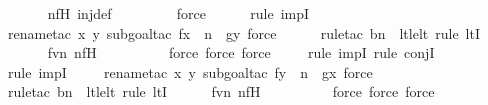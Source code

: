 \begin{isabellebody}
\ \ \ \ \isamarkupfalse%
\ nfH\ inj{\isacharunderscore}{\kern0pt}def\ \isanewline
\ \ \ \ \ \ \isamarkupfalse%
\ force\isanewline
\ \ \ \ \ \isamarkupfalse%
{\isacharparenleft}{\kern0pt}rule\ impI{\isacharparenright}{\kern0pt}{\isacharplus}{\kern0pt}\isanewline
\ \ \ \ \ \isamarkupfalse%
{\isacharparenleft}{\kern0pt}rename{\isacharunderscore}{\kern0pt}tac\ x\ y{\isacharcomma}{\kern0pt}\ subgoal{\isacharunderscore}{\kern0pt}tac\ {\isachardoublequoteopen}f{\isacharbackquote}{\kern0pt}x\ {\isacharless}{\kern0pt}\ n\ {\isacharhash}{\kern0pt}{\isacharplus}{\kern0pt}\ g{\isacharbackquote}{\kern0pt}y{\isachardoublequoteclose}{\isacharcomma}{\kern0pt}\ force{\isacharparenright}{\kern0pt}\isanewline
\ \ \ \ \ \isamarkupfalse%
{\isacharparenleft}{\kern0pt}rule{\isacharunderscore}{\kern0pt}tac\ b{\isacharequal}{\kern0pt}n\ \ lt{\isacharunderscore}{\kern0pt}le{\isacharunderscore}{\kern0pt}lt{\isacharcomma}{\kern0pt}\ rule\ ltI{\isacharparenright}{\kern0pt}\isanewline
\ \ \ \ \isamarkupfalse%
\ fvn\ nfH\ \isanewline
\ \ \ \ \ \ \ \isamarkupfalse%
\ {\isacharparenleft}{\kern0pt}force{\isacharcomma}{\kern0pt}\ force{\isacharcomma}{\kern0pt}\ force{\isacharparenright}{\kern0pt}\isanewline
\ \ \ \ \isamarkupfalse%
{\isacharparenleft}{\kern0pt}rule\ impI{\isacharcomma}{\kern0pt}\ rule\ conjI{\isacharparenright}{\kern0pt}{\isacharplus}{\kern0pt}\isanewline
\ \ \ \ \ \isamarkupfalse%
{\isacharparenleft}{\kern0pt}rule\ impI{\isacharparenright}{\kern0pt}\isanewline
\ \ \ \ \isamarkupfalse%
{\isacharparenleft}{\kern0pt}rename{\isacharunderscore}{\kern0pt}tac\ x\ y{\isacharcomma}{\kern0pt}\ subgoal{\isacharunderscore}{\kern0pt}tac\ {\isachardoublequoteopen}f{\isacharbackquote}{\kern0pt}y\ {\isacharless}{\kern0pt}\ n\ {\isacharhash}{\kern0pt}{\isacharplus}{\kern0pt}\ g{\isacharbackquote}{\kern0pt}x{\isachardoublequoteclose}{\isacharcomma}{\kern0pt}\ force{\isacharparenright}{\kern0pt}\isanewline
\ \ \ \ \ \isamarkupfalse%
{\isacharparenleft}{\kern0pt}rule{\isacharunderscore}{\kern0pt}tac\ b{\isacharequal}{\kern0pt}n\ \ lt{\isacharunderscore}{\kern0pt}le{\isacharunderscore}{\kern0pt}lt{\isacharcomma}{\kern0pt}\ rule\ ltI{\isacharparenright}{\kern0pt}\isanewline
\ \ \ \ \isamarkupfalse%
\ fvn\ nfH\ \isanewline
\ \ \ \ \ \ \ \isamarkupfalse%
\ {\isacharparenleft}{\kern0pt}force{\isacharcomma}{\kern0pt}\ force{\isacharcomma}{\kern0pt}\ force{\isacharparenright}{\kern0pt}\isanewline

\end{isabellebody}
